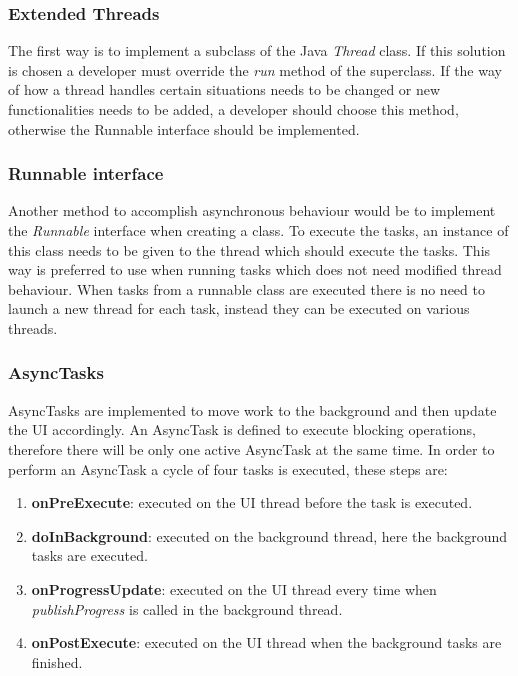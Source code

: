     \subsubsection{Extended Threads}
    The first way is to implement a subclass of the Java \emph{Thread} class. If this solution is chosen a developer must override the \emph{run} method of the superclass. If the way of how a thread handles certain situations needs to be changed or new functionalities needs to be added, a developer should choose this method, otherwise the Runnable interface should be implemented.

    \subsubsection{Runnable interface}
    Another method to accomplish asynchronous behaviour would be to implement the \emph{Runnable} interface when creating a class. To execute the tasks, an instance of this class needs to be given to the thread which should execute the tasks. This way is preferred to use when running tasks which does not need modified thread behaviour. When tasks from a runnable class are executed there is no need to launch a new thread for each task, instead they can be executed on various threads.

    \subsubsection{AsyncTasks}
    AsyncTasks are implemented to move work to the background and then update the UI accordingly. An AsyncTask is defined to execute blocking operations, therefore there will be only one active AsyncTask at the same time. In order to perform an AsyncTask a cycle of four tasks is executed, these steps are:

    \begin{enumerate}
        \item \textbf{onPreExecute}: executed on the UI thread before the task is executed.
        \item \textbf{doInBackground}: executed on the background thread, here the background tasks are executed.
        \item \textbf{onProgressUpdate}: executed on the UI thread every time when \emph{publishProgress} is called in the background thread.
        \item \textbf{onPostExecute}: executed on the UI thread when the background tasks are finished.
    \end{enumerate}

